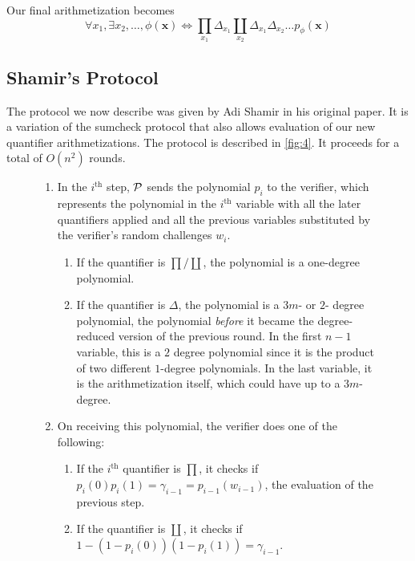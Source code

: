 Our final arithmetization becomes
$$\forall x_1,\exists x_2,\dots,\phi(\textbf{x})\Leftrightarrow\prod_{x_1}\Delta_{x_1}\coprod_{x_2}\Delta_{x_1}\Delta_{x_2}\dots p_{\phi}(\mathbf{x})$$

\subsection{Shamir's Protocol}

The protocol we now describe was given by Adi Shamir in his original \cite{10.1145/146585.146609} paper. It is a variation of the sumcheck protocol that also allows evaluation of our new quantifier arithmetizations. The protocol is described in \ref{fig:4}. It proceeds for a total of $O(n^2)$ rounds.


\begin{figure}[h]
	\begin{mdframed}[
		linecolor=black,
		linewidth=1pt,
		roundcorner=5pt,
		backgroundcolor=white,
		userdefinedwidth=\textwidth,
		]
		\vspace{2mm}
		\begin{enumerate}
			\item In the $i^{\text{th}}$ step, $\mathcal{P}$ sends the polynomial $p_i$ to the verifier, which represents the polynomial in the $i^{\text{th}}$ variable with all the later quantifiers applied and all the previous variables substituted by the verifier's random challenges $w_i$.
			\begin{enumerate}
				\item If the quantifier is $\prod/\coprod$, the polynomial is a one-degree polynomial.
				\item If the quantifier is $\Delta$, the polynomial is a $3m$- or $2$- degree polynomial, the polynomial \textit{before} it became the degree-reduced version of the previous round. In the first $n-1$ variable, this is a $2$ degree polynomial since it is the product of two different $1$-degree polynomials. In the last variable, it is the arithmetization itself, which could have up to a $3m$-degree. 
			\end{enumerate}
			\item On receiving this polynomial, the verifier does one of the following:
			\begin{enumerate}
				\item If the $i^{\text{th}}$ quantifier is $\prod$, it checks if $p_i(0)p_i(1)=\gamma_{i-1}=p_{i-1}(w_{i-1})$, the evaluation of the previous step.
				\item If the quantifier is $\coprod$, it checks if $1-(1-p_i(0))(1-p_i(1))=\gamma_{i-1}$.

\end{enumerate}
\end{enumerate}
\end{mdframed}
\end{figure}
